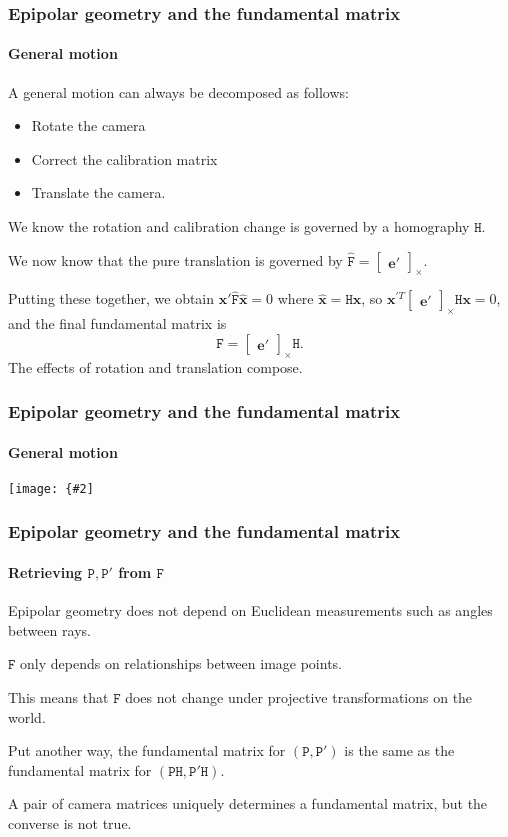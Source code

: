 \documentclass[aspectratio=169]{beamer}
\renewcommand{\vec}[1]{\boldsymbol{#1}}
\newcommand{\mat}[1]{\mathtt{#1}}
\newcommand{\crossmat}[1]{\begin{bmatrix} #1 \end{bmatrix}_{\times}}
\newcommand{\myfig}[3]{\centerline{\texttt{[image: \{\#2]}}}
    \centerline{\scriptsize #3}}
\begin{document}
\begin{frame}
\frametitle{Epipolar geometry and the fundamental matrix}
\framesubtitle{General motion}

A \alert{general motion} can always be decomposed as follows:
\begin{itemize}
\item Rotate the camera
\item Correct the calibration matrix
\item Translate the camera.
\end{itemize}

\medskip

We know the rotation and calibration change is governed by a
homography $\mat{H}$.

\medskip

We now know that the pure translation is governed by
$\hat{\mat{F}}=\crossmat{\vec{e}'}$.

\medskip

Putting these together, we obtain
$\vec{x}'\hat{\mat{F}}\hat{\vec{x}}=0$ where $\hat{\vec{x}}=\mat{H}\vec{x}$,
so $\vec{x}^{\prime T}\crossmat{\vec{e}'}\mat{H}\vec{x}=0$,
and the final fundamental matrix is
\begin{equation*}
\mat{F}=\crossmat{\vec{e}'}\mat{H}.
\end{equation*}
The effects of rotation and translation compose.

\end{frame}

\begin{frame}
\frametitle{Epipolar geometry and the fundamental matrix}
\framesubtitle{General motion}

\myfig{3.5in}{HZ-fig8-9}{Hartley and Zisserman (2004), Fig.\ 9.9}

\end{frame}

\begin{frame}
\frametitle{Epipolar geometry and the fundamental matrix}
\framesubtitle{Retrieving $\mat{P},\mat{P}'$ from $\mat{F}$}

Epipolar geometry \alert{does not depend on Euclidean measurements}
such as angles between rays.

\medskip

$\mat{F}$ only depends on relationships between image points.

\medskip

This means that $\mat{F}$ \alert{does not change} under projective
transformations on the world.

\medskip

Put another way, the fundamental matrix for $(\mat{P},\mat{P}')$ is
the \alert{same} as the fundamental matrix for
$(\mat{P}\mat{H},\mat{P}'\mat{H})$.

\medskip

\alert{A pair of camera matrices uniquely determines a fundamental
matrix, but the converse is not true.}

\end{frame}
\end{document}
